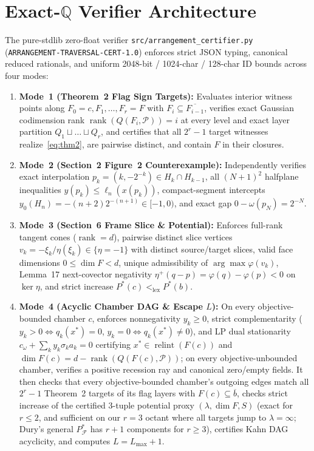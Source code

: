 \documentclass[10pt,twocolumn]{article}
\newcommand{\QQ}{\mathbb{Q}}
\begin{document}
\section{Exact-\texorpdfstring{$\QQ$}{Q} Verifier Architecture}\label{sec:certifier}
The pure-stdlib zero-float verifier \texttt{src/arrangement\_certifier.py} (\texttt{ARRANGEMENT-TRAVERSAL-CERT-1.0}) enforces strict JSON typing, canonical reduced rationals, and uniform 2048-bit / 1024-char / 128-char ID bounds across four modes:
\begin{enumerate}[leftmargin=1.2em,itemsep=1pt,topsep=2pt]
  \item \textbf{Mode~1 (Theorem~2 Flag Sign Targets):} Evaluates interior witness points along $F_0 = c, F_1, \dots, F_r = F$ with $F_i \subseteq \overline{F_{i-1}}$, verifies exact Gaussian codimension rank $\operatorname{rank}(Q(F_i,\mathcal{P})) = i$ at every level and exact layer partition $Q_1 \sqcup \dots \sqcup Q_r$, and certifies that all $2^r - 1$ target witnesses realize~\eqref{eq:thm2}, are pairwise distinct, and contain $F$ in their closures.
  \item \textbf{Mode~2 (Section~2 Figure~2 Counterexample):} Independently verifies exact interpolation $p_k = (k, -2^{-k}) \in H_k \cap H_{k-1}$, all $(N+1)^2$ halfplane inequalities $y(p_k) \le \ell_n(x(p_k))$, compact-segment intercepts $y_0(H_n) = -(n+2)2^{-(n+1)} \in [-1,0)$, and exact gap $0 - \omega(p_N) = 2^{-N}$.
  \item \textbf{Mode~3 (Section~6 Frame Slice \& Potential):} Enforces full-rank tangent cones ($\operatorname{rank} = d$), pairwise distinct slice vertices $v_k = -\xi_k/\eta(\xi_k) \in \{\eta = -1\}$ with distinct source/target slices, valid face dimensions $0 \le \dim F < d$, unique admissibility of $\arg\max \varphi(v_k)$, Lemma~17 next-covector negativity $\eta^+(q-p) = \varphi(q)-\varphi(p) < 0$ on $\ker\eta$, and strict increase $P^*(c) <_{\mathrm{lex}} P^*(b)$.
  \item \textbf{Mode~4 (Acyclic Chamber DAG \& Escape $L$):} On every objective-bounded chamber $c$, enforces nonnegativity $y_k \ge 0$, strict complementarity ($y_k > 0 \iff q_k(x^*) = 0$, $y_k = 0 \iff q_k(x^*) \neq 0$), and LP dual stationarity $c_{\omega} + \sum_k y_k \sigma_k a_k = 0$ certifying $x^* \in \operatorname{relint}(F(c))$ and $\dim F(c) = d - \operatorname{rank}(Q(F(c),\mathcal{P}))$; on every objective-unbounded chamber, verifies a positive recession ray and canonical zero/empty fields. It then checks that every objective-bounded chamber's outgoing edges match all $2^r - 1$ Theorem~2 targets of its flag layers with $F(c) \subseteq \overline{b}$, checks strict increase of the certified 3-tuple potential proxy $(\lambda, \dim F, S)$ (exact for $r\le 2$, and sufficient on our $r=3$ octant where all targets jump to $\lambda=\infty$; Dury's general $P^*_{\mathcal{F}}$ has $r+1$ components for $r\ge 3$), certifies Kahn DAG acyclicity, and computes $L = L_{\max} + 1$.
\end{enumerate}
\end{document}
